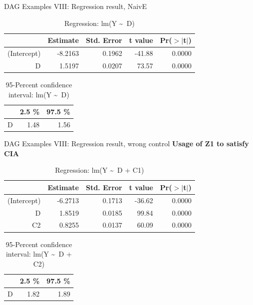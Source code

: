 \documentclass{beamer}\usepackage[]{graphicx}\usepackage[]{xcolor}
\begin{document}
\begin{frame}[fragile]{DAG Examples VIII: Regression result, NaivE}
\begin{table}[ht]
\centering
\begingroup\small
\begin{tabular}{rrrrr}
  \hline
 & Estimate & Std. Error & t value & Pr($>$$|$t$|$) \\ 
  \hline
(Intercept) & -8.2163 & 0.1962 & -41.88 & 0.0000 \\ 
  D & 1.5197 & 0.0207 & 73.57 & 0.0000 \\ 
   \hline
\end{tabular}
\endgroup
\caption{Regression: lm(Y \textasciitilde ~D)} 
\end{table}
\begin{table}[ht]
\centering
\begingroup\small
\begin{tabular}{rrr}
  \hline
 & 2.5 \% & 97.5 \% \\ 
  \hline
D & 1.48 & 1.56 \\ 
   \hline
\end{tabular}
\endgroup
\caption{95-Percent confidence interval: lm(Y \textasciitilde ~D)} 
\end{table}

\end{frame}

\begin{frame}[fragile]{DAG Examples VIII: Regression result, wrong control}
\textbf{Usage of Z1 to satisfy CIA}
\begin{table}[ht]
\centering
\begingroup\small
\begin{tabular}{rrrrr}
  \hline
 & Estimate & Std. Error & t value & Pr($>$$|$t$|$) \\ 
  \hline
(Intercept) & -6.2713 & 0.1713 & -36.62 & 0.0000 \\ 
  D & 1.8519 & 0.0185 & 99.84 & 0.0000 \\ 
  C2 & 0.8255 & 0.0137 & 60.09 & 0.0000 \\ 
   \hline
\end{tabular}
\endgroup
\caption{Regression: lm(Y \textasciitilde ~D + C1)} 
\end{table}
\begin{table}[ht]
\centering
\begingroup\small
\begin{tabular}{rrr}
  \hline
 & 2.5 \% & 97.5 \% \\ 
  \hline
D & 1.82 & 1.89 \\ 
   \hline
\end{tabular}
\endgroup
\caption{95-Percent confidence interval: lm(Y \textasciitilde ~D + C2)} 
\end{table}

\end{frame}
\end{document}

